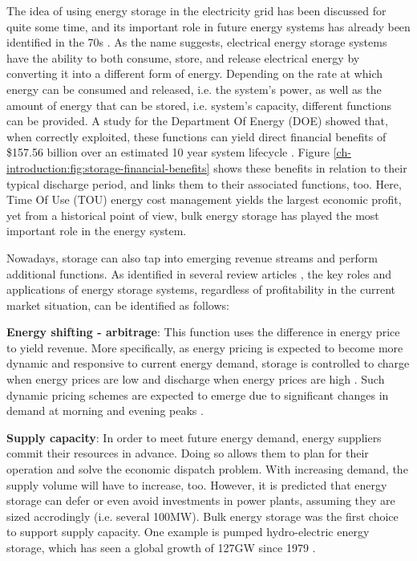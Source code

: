 The idea of using energy storage in the electricity grid has been discussed for quite some time, and its important role in future energy systems has already been identified in the 70s \cite{Kalhammer1979}.
As the name suggests, electrical energy storage systems have the ability to both consume, store, and release electrical energy by converting it into a different form of energy.
Depending on the rate at which energy can be consumed and released, i.e. the system's power, as well as the amount of energy that can be stored, i.e. system's capacity, different functions can be provided.
A study for the Department Of Energy (DOE) showed that, when correctly exploited, these functions can yield direct financial benefits of \$157.56 billion over an estimated 10 year system lifecycle \cite{Eyer2010a}.
Figure \ref{ch-introduction:fig:storage-financial-benefits} shows these benefits in relation to their typical discharge period, and links them to their associated functions, too.
Here, Time Of Use (TOU) energy cost management yields the largest economic profit, yet from a historical point of view, bulk energy storage has played the most important role in the energy system.

Nowadays, storage can also tap into emerging revenue streams and perform additional functions.
As identified in several review articles \cite{Chen2009, Katsanevakis2017, Guney2017}, the key roles and applications of energy storage systems, regardless of profitability in the current market situation, can be identified as follows:

\textbf{Energy shifting - arbitrage}: This function uses the difference in energy price to yield revenue.
More specifically, as energy pricing is expected to become more dynamic and responsive to current energy demand, storage is controlled to charge when energy prices are low and discharge when energy prices are high \cite{Chen2009, Leou2012}.
Such dynamic pricing schemes are expected to emerge due to significant changes in demand at morning and evening peaks \cite{Koohi-Kamali2013}.

\textbf{Supply capacity}: In order to meet future energy demand, energy suppliers commit their resources in advance.
Doing so allows them to plan for their operation and solve the economic dispatch problem.
With increasing demand, the supply volume will have to increase, too.
However, it is predicted that energy storage can defer or even avoid investments in power plants, assuming they are sized accrodingly (i.e. several 100MW)\cite{Dobie1998}.
Bulk energy storage was the first choice to support supply capacity.
One example is pumped hydro-electric energy storage, which has seen a global growth of 127GW since 1979 \cite{Rehman2015, Barbour2015, Barbour2016}.

